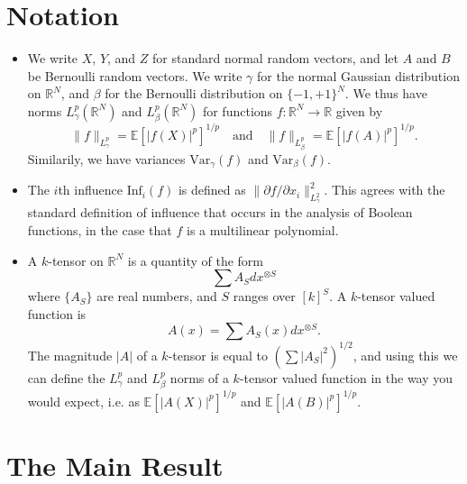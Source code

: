 \documentclass{article}
\theoremstyle{plain}
\theoremstyle{definition}
\begin{document}
\section{Notation}

\begin{itemize}
    \item We write $X$, $Y$, and $Z$ for standard normal random vectors, and let $A$ and $B$ be Bernoulli random vectors. We write $\gamma$ for the normal Gaussian distribution on $\mathbb{R}^N$, and $\beta$ for the Bernoulli distribution on $\{ -1, +1 \}^N$. We thus have norms $L^p_\gamma(\mathbb{R}^N)$ and $L^p_\beta(\mathbb{R}^N)$ for functions $f: \mathbb{R}^N \to \mathbb{R}$ given by
%
\[ \| f \|_{L^p_\gamma} = \mathbb{E}[|f(X)|^p]^{1/p} \quad\text{and}\quad \| f \|_{L^p_\beta} = \mathbb{E}[|f(A)|^p]^{1/p}. \]
%
Similarily, we have variances $\text{Var}_\gamma(f)$ and $\text{Var}_\beta(f)$.

    \item The $i$th influence $\text{Inf}_i(f)$ is defined as $\| \partial f / \partial x_i \|_{L^2_\gamma}^2$. This agrees with the standard definition of influence that occurs in the analysis of Boolean functions, in the case that $f$ is a multilinear polynomial. 

    \item A $k$-tensor on $\mathbb{R}^N$ is a quantity of the form
    \[ \sum A_S dx^{\otimes S} \]
    where $\{ A_S \}$ are real numbers, and $S$ ranges over $[k]^S$. A $k$-tensor valued function is
    \[ A(x) = \sum A_S(x) dx^{\otimes S}. \]
    The magnitude $|A|$ of a $k$-tensor is equal to $(\sum |A_S|^2 )^{1/2}$, and using this we can define the $L^p_\gamma$ and $L^p_\beta$ norms of a $k$-tensor valued function in the way you would expect, i.e. as $\mathbb{E}[|A(X)|^p]^{1/p}$ and $\mathbb{E}[|A(B)|^p]^{1/p}$. %
\end{itemize}

\section{The Main Result}
\end{document}
